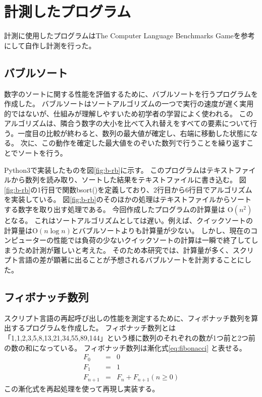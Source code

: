 \chapter{計測したプログラム}
\label{cha:program}
計測に使用したプログラムはThe Computer Language Benchmarks Game\cite{Benchmark}を参考にして自作し計測を行った。
\section{バブルソート}
数字のソートに関する性能を評価するために、バブルソートを行うプログラムを作成した。
バブルソートはソートアルゴリズムの一つで実行の速度が遅く実用的ではないが、仕組みが理解しやすいため初学者の学習によく使われる。
このアルゴリズムは、隣合う数字の大小を比べて入れ替えをすべての要素について行う。一度目の比較が終わると、数列の最大値が確定し、右端に移動した状態になる。
次に、この動作を確定した最大値をのぞいた数列で行うことを繰り返すことでソートを行う。

Python3で実装したものを図\ref{fig:b-rb}に示す。
このプログラムはテキストファイルから数列を読み取り、ソートした結果をテキストファイルに書き込む。
図\ref{fig:b-rb}の1行目で関数bsort()を定義しており、2行目から6行目でアルゴリズムを実装している。
図\ref{fig:b-rb}のそのほかの処理はテキストファイルからソートする数字を取り出す処理である。
今回作成したプログラムの計算量は O$(n^{2})$ となる。
これはソートアルゴリズムとしては遅い。例えば、クイックソートの計算量はO$(n\log{n})$とバブルソートよりも計算量が少ない。
しかし、現在のコンピューターの性能では負荷の少ないクイックソートの計算は一瞬で終了してしまうため計測が難しいと考えた。
そのため本研究では、計算量が多く、スクリプト言語の差が顕著に出ることが予想されるバブルソートを計測することにした。

\section{フィボナッチ数列}
スクリプト言語の再起呼び出しの性能を測定するために、フィボナッチ数列を算出するプログラムを作成した。
フィボナッチ数列とは「1,1,2,3,5,8,13,21,34,55,89,144」という様に数列のそれぞれの数が1つ前と2つ前の数の和になっている。
フィボナッチ数列は漸化式\ref{eq:fibonacci} と表せる。
\begin{eqnarray} \label{eq:fibonacci}
  F_{0}&=&0 \nonumber \\
  F_{1}&=&1 \\
  F_{n+1}&=&F_{n}+F_{n+1}(n≥0)\nonumber
\end{eqnarray}
この漸化式を再起処理を使って再現し実装する。

